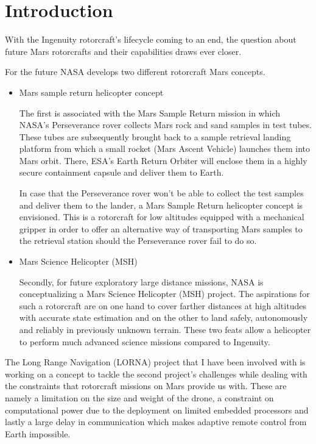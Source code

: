 \chapter{Introduction}
\label{sec:introduction}

With the Ingenuity rotorcraft's lifecycle coming to an end, the question about future Mars rotorcrafts and their capabilities draws ever closer.

For the future NASA develops two different rotorcraft Mars concepts. 

\begin{itemize}
    \item Mars sample return helicopter concept

    The first is associated with the Mars Sample Return mission in  which NASA's Perseverance rover collects Mars rock and sand samples in test tubes. These tubes are subsequently brought back to a sample retrieval landing platform from which a small rocket (Mars Ascent Vehicle) launches them into Mars orbit. There, ESA's Earth Return Orbiter will enclose them in a highly secure containment capsule and deliver them to Earth.
    
    In case that the Perseverance rover won't be able to collect the test samples and deliver them to the lander, a Mars Sample Return helicopter concept is envisioned. This is a rotorcraft for low altitudes equipped with a mechanical gripper in order to offer an alternative way of transporting Mars samples to the retrieval station should the Perseverance rover fail to do so.

    \item Mars Science Helicopter (MSH)

    Secondly, for future exploratory large distance missions, NASA is conceptualizing a Mars Science Helicopter (MSH) project. The aspirations for such a rotorcraft are on one hand to cover farther distances at high altitudes with accurate state estimation and on the other to land safely, autonomously and reliably in previously unknown terrain. These two feats allow a helicopter to perform much advanced science missions compared to Ingenuity. 
\end{itemize}

The Long Range Navigation (LORNA) project that I have been involved with is working on a concept to tackle the second project's challenges while dealing with the constraints that rotorcraft missions on Mars provide us with. These are namely a limitation on the size and weight of the drone, a constraint on computational power due to the deployment on limited embedded processors and lastly a large delay in communication which makes adaptive remote control from Earth impossible.

